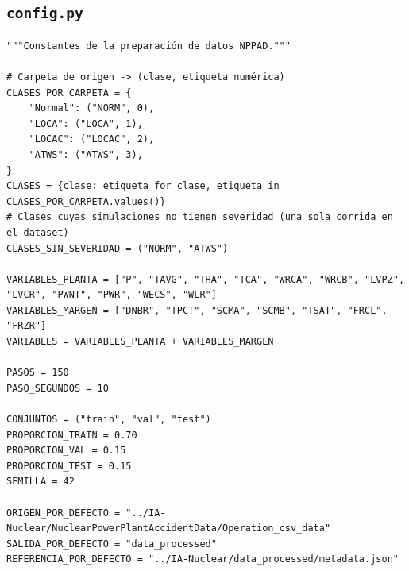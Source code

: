\documentclass[12pt,a4paper]{article}
\begin{document}
\subsection*{\texttt{config.py}}
\begin{lstlisting}
"""Constantes de la preparación de datos NPPAD."""

# Carpeta de origen -> (clase, etiqueta numérica)
CLASES_POR_CARPETA = {
    "Normal": ("NORM", 0),
    "LOCA": ("LOCA", 1),
    "LOCAC": ("LOCAC", 2),
    "ATWS": ("ATWS", 3),
}
CLASES = {clase: etiqueta for clase, etiqueta in CLASES_POR_CARPETA.values()}
# Clases cuyas simulaciones no tienen severidad (una sola corrida en el dataset)
CLASES_SIN_SEVERIDAD = ("NORM", "ATWS")

VARIABLES_PLANTA = ["P", "TAVG", "THA", "TCA", "WRCA", "WRCB", "LVPZ", "LVCR", "PWNT", "PWR", "WECS", "WLR"]
VARIABLES_MARGEN = ["DNBR", "TPCT", "SCMA", "SCMB", "TSAT", "FRCL", "FRZR"]
VARIABLES = VARIABLES_PLANTA + VARIABLES_MARGEN

PASOS = 150
PASO_SEGUNDOS = 10

CONJUNTOS = ("train", "val", "test")
PROPORCION_TRAIN = 0.70
PROPORCION_VAL = 0.15
PROPORCION_TEST = 0.15
SEMILLA = 42

ORIGEN_POR_DEFECTO = "../IA-Nuclear/NuclearPowerPlantAccidentData/Operation_csv_data"
SALIDA_POR_DEFECTO = "data_processed"
REFERENCIA_POR_DEFECTO = "../IA-Nuclear/data_processed/metadata.json"
\end{lstlisting}
\end{document}
